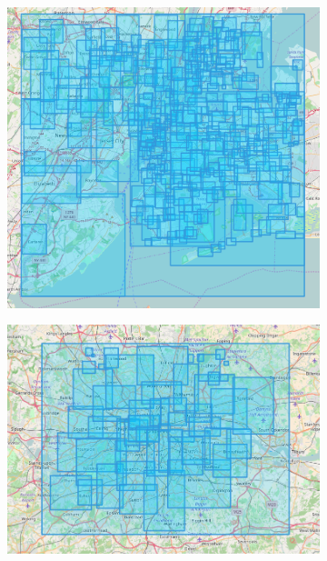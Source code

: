 \begin{figure}[!htbp]
	\centering
	\begin{subfigure}[htbp]{0.3\textwidth}
		\centering
		\includegraphics[width=1\linewidth]{figures/nyc_bbs.png}
		\caption{}
		\label{subfig:nyc_bounding_boxes}
	\end{subfigure}
	\quad
	\begin{subfigure}[htbp]{0.3\textwidth}
		\centering
		\includegraphics[width=1\linewidth]{figures/london_bbs.png}
		\caption{}
		\label{subfig:london_bounding_boxes}

\end{subfigure}
\end{figure}
